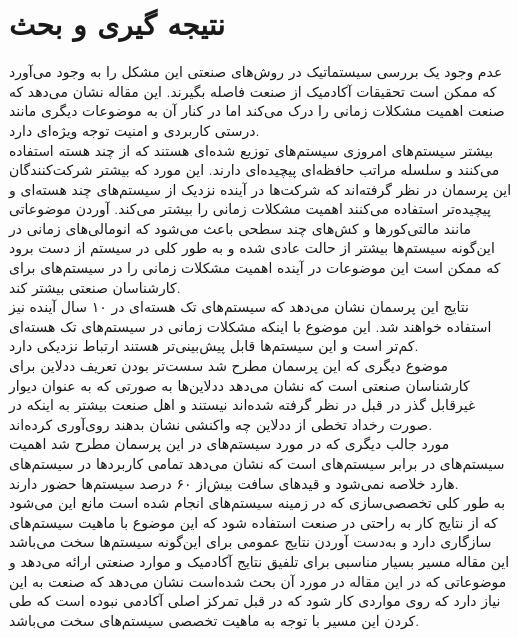\documentclass[a4paper, 11pt]{article}
\begin{document}
\section{نتیجه گیری و بحث}
عدم وجود یک بررسی سیستماتیک در روش‌های صنعتی این مشکل را به وجود می‌آورد که ممکن است
تحقیقات آکادمیک از صنعت فاصله بگیرند. این مقاله نشان می‌دهد که صنعت اهمیت
مشکلات زمانی را درک می‌کند اما در کنار آن به موضوعات دیگری مانند درستی کاربردی و امنیت
توجه ویژه‌ای دارد. \\
بیشتر سیستم‌های
امروزی سیستم‌های توزیع شده‌ای هستند که از چند هسته استفاده می‌کنند و سلسله مراتب
حافظه‌ای پیچیده‌ای دارند.
این مورد که بیشتر شرکت‌کنندگان این پرسمان در نظر گرفته‌اند که شرکت‌ها در آینده نزدیک از سیستم‌های
چند هسته‌ای و پیچیده‌تر استفاده می‌کنند اهمیت مشکلات زمانی را بیشتر می‌کند.
آوردن موضوعاتی مانند مالتی‌کور‌ها و کش‌های چند سطحی باعث می‌شود که انومالی‌های
زمانی در این‌گونه سیستم‌ها بیشتر از حالت عادی شده و به طور کلی
در سیستم از دست برود که ممکن است این موضوعات در آینده اهمیت مشکلات زمانی را در سیستم‌های
برای کارشناسان صنعتی بیشتر کند. \\
نتایج این پرسمان نشان می‌دهد که سیستم‌های تک هسته‌ای در ۱۰ سال آینده نیز استفاده خواهند شد.
این موضوع با اینکه مشکلات زمانی در سیستم‌های تک هسته‌ای کم‌تر است و این سیستم‌ها
قابل پیش‌بینی‌تر هستند ارتباط نزدیکی دارد. \\
موضوع دیگری که این پرسمان مطرح شد سست‌تر بودن تعریف ددلاین برای کارشناسان
صنعتی است که نشان می‌دهد ددلاین‌ها به صورتی که به عنوان دیوار غیر‌قابل‌ گذر در قبل در نظر گرفته
شده‌اند نیستند و اهل صنعت بیشتر به اینکه در صورت رخداد تخطی از ددلاین چه واکنشی نشان بدهند
روی‌آوری کرده‌اند. \\
مورد جالب دیگری که در مورد سیستم‌های
در این پرسمان مطرح شد اهمیت سیستم‌های
در برابر سیستم‌های
است که نشان می‌دهد تمامی کاربرد‌ها در سیستم‌های هارد خلاصه نمی‌شود و قید‌های سافت
بیش‌از ۶۰ درصد سیستم‌ها حضور دارند. \\
به طور کلی تخصصی‌سازی که در زمینه سیستم‌های
انجام شده است مانع این می‌شود که از نتایج کار به راحتی در صنعت استفاده شود که این موضوع با
ماهیت سیستم‌های
سازگاری دارد و به‌دست آوردن نتایج عمومی برای این‌گونه سیستم‌ها سخت می‌باشد
این مقاله مسیر بسیار مناسبی برای
تلفیق نتایج آکادمیک و موارد صنعتی ارائه می‌دهد و موضوعاتی که در این مقاله در مورد آن بحث
شده‌است نشان می‌دهد که صنعت به این نیاز دارد که روی مواردی کار شود که در قبل تمرکز اصلی
آکادمی نبوده است که طی کردن این مسیر با توجه به ماهیت تخصصی سیستم‌های
سخت می‌باشد.


\end{document}
